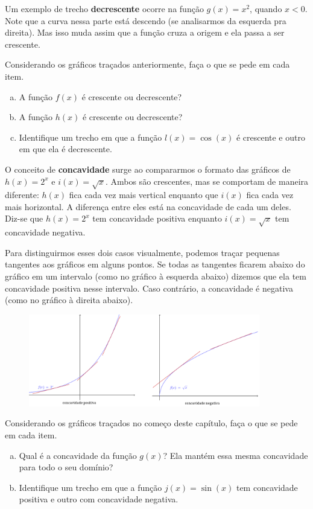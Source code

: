 \documentclass[main_estudante.tex]{subfiles}
\begin{document}
Um exemplo de trecho \textbf{decrescente} ocorre na função $g(x)=x^2$,  quando $x<0$. Note que a curva nessa parte está descendo (se analisarmos da esquerda pra direita). Mas isso muda assim que a função cruza a origem e ela passa a ser crescente.

\begin{questao}
Considerando os gráficos traçados anteriormente, faça o que se pede em cada item.
\begin{enumerate}[a)]
\item A função $f(x)$ é crescente ou decrescente?
\item A função $h(x)$ é crescente ou decrescente?
\item Identifique um trecho em que a função $l(x)=\cos(x)$ é crescente e outro em que ela é decrescente.
\end{enumerate}
\end{questao}

O conceito de \textbf{concavidade} surge ao compararmos o formato das gráficos de $h(x)=2^x$ e $i(x)=\sqrt{x}$. Ambos são crescentes, mas se comportam de maneira diferente: $h(x)$ fica cada vez mais vertical enquanto que $i(x)$ fica cada vez mais horizontal. A diferença entre eles está na concavidade de cada um deles. Diz-se que $h(x)=2^x$ tem concavidade positiva enquanto $i(x)=\sqrt{x}$ tem concavidade negativa.

Para distinguirmos esses dois casos visualmente, podemos traçar pequenas tangentes aos gráficos em alguns pontos. Se todas as tangentes ficarem abaixo do gráfico em um intervalo (como no gráfico à esquerda abaixo) dizemos que ela tem concavidade positiva nesse intervalo. Caso contrário, a concavidade é negativa (como no gráfico à direita abaixo).

\begin{figure}[h]
\centering
\includegraphics[width=0.9\textwidth]{./img/c7q2.png}
\end{figure}

\begin{questao}
Considerando os gráficos traçados no começo deste capítulo, faça o que se pede em cada item.
\begin{enumerate}[a)]
\item Qual é a concavidade da função $g(x)$? Ela mantém essa mesma concavidade para todo o seu domínio?
\item Identifique um trecho em que a função $j(x)=\sin(x)$ tem concavidade positiva e outro com concavidade negativa.
\end{enumerate}
\end{questao}
\end{document}
